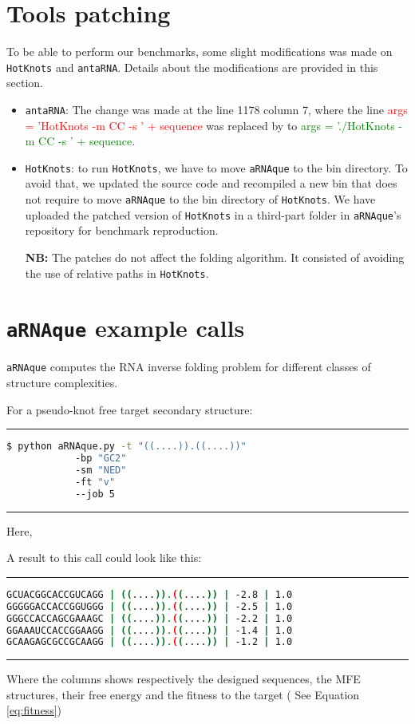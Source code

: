\section{Tools patching}
To be able to perform our benchmarks, some slight modifications was made on \texttt{HotKnots} and \texttt{antaRNA}. Details about the modifications are provided in this section.
\begin{itemize}
	\item \texttt{antaRNA}: The change was made at the line 1178 column 7, where the line \textcolor{red}{args = 'HotKnots -m CC -s ' + sequence} was replaced by to \textcolor{green}{args = './HotKnots -m CC -s ' + sequence}.
	\item \texttt{HotKnots}: to run \texttt{HotKnots}, we have to move \texttt{aRNAque} to the bin directory. To avoid that, we updated the source code and recompiled a new bin that does not require to move \texttt{aRNAque} to the bin directory of \texttt{HotKnots}. We have uploaded the patched version of \texttt{HotKnots} in a third-part folder in \texttt{aRNAque}'s repository for benchmark reproduction.
	
	\textbf{NB:} The patches do not affect the folding algorithm. It consisted of avoiding the use of relative paths in \texttt{HotKnots}. 
\end{itemize}


\section{\texttt{aRNAque} example calls}

\texttt{aRNAque} computes the RNA inverse folding problem for different classes of structure complexities. 


\noindent For a pseudo-knot free target secondary structure: 

\noindent \rule{12cm}{0.4pt}
\begin{lstlisting}[language=bash]
$ python aRNAque.py -t "((....)).((....))"   
			-bp "GC2"
			-sm "NED" 
			-ft "v"
			--job 5
\end{lstlisting}
\rule{12cm}{0.4pt}

\noindent Here, 


\noindent A result to this call could look like this: 

\noindent \rule{12cm}{0.4pt}
\begin{lstlisting}[language=bash]
GCUACGGCACCGUCAGG | ((....)).((....)) | -2.8 | 1.0
GGGGGACCACCGGUGGG | ((....)).((....)) | -2.5 | 1.0
GGGCCACCAGCGAAAGC | ((....)).((....)) | -2.2 | 1.0
GGAAAUCCACCGGAAGG | ((....)).((....)) | -1.4 | 1.0
GCAAGAGCGCCGCAAGG | ((....)).((....)) | -1.2 | 1.0
\end{lstlisting}
\noindent \rule{12cm}{0.4pt}

\noindent Where the columns shows respectively the designed sequences, the MFE structures, their free energy and the fitness to the target ( See Equation \ref{eq:fitness})